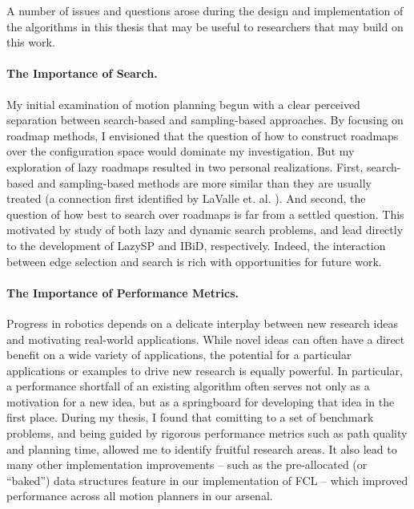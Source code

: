 
A number of issues and questions arose during the design and
implementation of the algorithms in this thesis
that may be useful to researchers that may build on this work.

\paragraph{The Importance of Search.}
My initial examination of motion planning begun with a clear
perceived separation between search-based and sampling-based
approaches.
By focusing on roadmap methods,
I envisioned that the question of how to construct roadmaps
over the configuration space would dominate my investigation.
But my exploration of lazy roadmaps resulted in two
personal realizations.
First,
search-based and sampling-based methods are more similar than they are
usually treated
(a connection first identified by LaValle et. al.
\citep{lavalle2004deterministic}).
And second,
the question of how best to search over roadmaps is far from a settled
question.
This motivated by study of both lazy and dynamic search problems,
and lead directly to the development of LazySP and IBiD,
respectively.
Indeed,
the interaction between edge selection and search is rich
with opportunities for future work.

\paragraph{The Importance of Performance Metrics.}
Progress in robotics depends on a delicate interplay between
new research ideas and motivating real-world applications.
While novel ideas can often have a direct benefit on a wide variety
of applications,
the potential for a particular applications or examples
to drive new research is equally powerful.
In particular,
a performance shortfall of an existing algorithm
often serves not only as a motivation for a new idea,
but as a springboard for developing that idea in the first place.
During my thesis,
I found that comitting to a set of benchmark problems,
and being guided by rigorous performance metrics such as path
quality and planning time,
allowed me to identify fruitful research areas.
It also lead to many other implementation improvements
-- such as the pre-allocated (or ``baked'') data structures feature
in our implementation of FCL -- which improved performance
across all motion planners in our arsenal.

